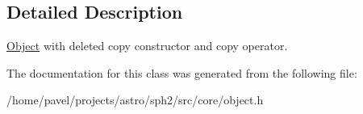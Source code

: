 \subsection{Detailed Description}
\hyperlink{classObject}{Object} with deleted copy constructor and copy operator. 

The documentation for this class was generated from the following file\+:\begin{DoxyCompactItemize}
\item 
/home/pavel/projects/astro/sph2/src/core/object.\+h\end{DoxyCompactItemize}
